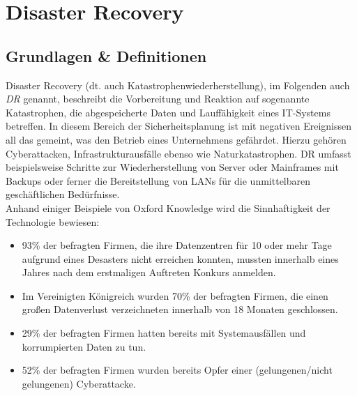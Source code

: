 \documentclass[letterpaper, 12pt]{article}
\let\tempsection\section
\renewcommand\section[1]{\vspace{-0.3cm}\tempsection{#1}\vspace{-0.3cm}}
\let\tempsubsection\subsection
\renewcommand\subsection[1]{\vspace{0cm}\tempsubsection{#1}\vspace{0cm}}
\begin{document}
\parindent 0pt
\parskip 6pt



\clearpage
\thispagestyle{empty}
\tableofcontents

\newpage
{}
\pagestyle{fancy}

\section{Disaster Recovery}

\subsection{Grundlagen \& Definitionen \cite{bookone} \cite{intro} \cite{intro2} \cite{intro3} \cite{downtime}}
Disaster Recovery (dt. auch Katastrophenwiederherstellung), im Folgenden auch \textit{DR} genannt, beschreibt die Vorbereitung und Reaktion auf sogenannte Katastrophen, die abgespeicherte Daten und Lauffähigkeit eines IT-Systems betreffen. In diesem Bereich der Sicherheitsplanung ist mit negativen Ereignissen all das gemeint, was den Betrieb eines Unternehmens gefährdet. Hierzu gehören Cyberattacken, Infrastrukturausfälle ebenso wie Naturkatastrophen. DR umfasst beispielsweise Schritte zur Wiederherstellung von Server oder Mainframes mit Backups oder ferner die Bereitstellung von LANs für die unmittelbaren geschäftlichen Bedürfnisse. \\

Anhand einiger Beispiele von Oxford Knowledge wird die Sinnhaftigkeit der Technologie bewiesen:

\begin{itemize}
	\item 93\% der befragten Firmen, die ihre Datenzentren für 10 oder mehr Tage aufgrund eines Desasters nicht erreichen konnten, mussten innerhalb eines Jahres nach dem erstmaligen Auftreten Konkurs anmelden.
	\item Im Vereinigten Königreich wurden 70\% der befragten Firmen, die einen großen Datenverlust verzeichneten innerhalb von 18 Monaten geschlossen.
	\item 29\% der befragten Firmen hatten bereits mit Systemausfällen und korrumpierten Daten zu tun.
	\item 52\% der befragten Firmen wurden bereits Opfer einer (gelungenen/nicht gelungenen) Cyberattacke.
\end{itemize}
\end{document}
